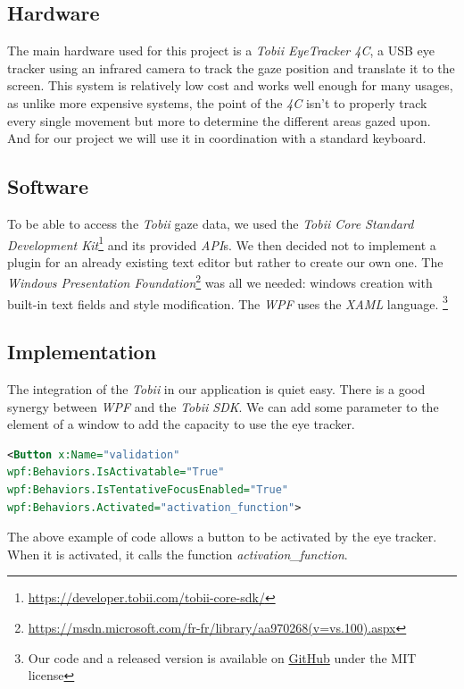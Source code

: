 \documentclass[12pt, a4paper]{article}
\begin{document}
\subsection{Hardware} \label{hardware}
The main hardware used for this project is a \textit{Tobii EyeTracker 4C}, a USB eye tracker using an infrared camera to track the gaze position and translate it to the screen. This system is relatively low cost and works well enough for many usages, as unlike more expensive systems, the point of the \textit{4C} isn't to properly track every single movement but more to determine the different areas gazed upon. 
And for our project we will use it in coordination with a standard keyboard.

\subsection{Software}
To be able to access the \textit{Tobii} gaze data, we used the \textit{Tobii Core Standard Development Kit}\footnote{\url{https://developer.tobii.com/tobii-core-sdk/}} and its provided \textit{API}s. We then decided not to implement a plugin for an already existing text editor but rather to create our own one. The \textit{Windows Presentation Foundation}\footnote{\url{https://msdn.microsoft.com/fr-fr/library/aa970268(v=vs.100).aspx}} was all we needed: windows creation with built-in text fields and style modification. The \textit{WPF} uses the \textit{XAML} language. \footnote{Our code and a released version is available on \href{https://github.com/marom17/E.A.T./releases/tag/1.0.5}{GitHub} under the MIT license}

\subsection{Implementation}
The integration of the \textit{Tobii} in our application is quiet easy. There is a good synergy between \textit{WPF} and the \textit{Tobii SDK}. We can add some parameter to the element of a window to add the capacity to use the eye tracker.

\begin{lstlisting}[frame=single, language=XML]
<Button x:Name="validation"
wpf:Behaviors.IsActivatable="True"
wpf:Behaviors.IsTentativeFocusEnabled="True"
wpf:Behaviors.Activated="activation_function">
\end{lstlisting}

The above example of code allows a button to be activated by the eye tracker. When it is activated, it calls the function \textit{activation\_function}.
\end{document}

